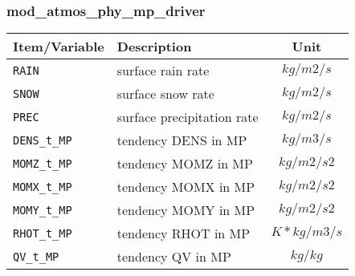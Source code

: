 \subsubsection{mod\_atmos\_phy\_mp\_driver}
 \begin{tabularx}{150mm}{|l|X|c|} \hline
 \rowcolor[gray]{0.9} Item/Variable & Description  & Unit \\ \hline
  \verb|RAIN| & surface rain rate & $kg/m2/s$ \\\hline
  \verb|SNOW| & surface snow rate & $kg/m2/s$ \\\hline
  \verb|PREC| & surface precipitation rate & $kg/m2/s$ \\\hline
  \verb|DENS_t_MP| & tendency DENS in MP & $kg/m3/s$ \\\hline
  \verb|MOMZ_t_MP| & tendency MOMZ in MP & $kg/m2/s2$ \\\hline
  \verb|MOMX_t_MP| & tendency MOMX in MP & $kg/m2/s2$ \\\hline
  \verb|MOMY_t_MP| & tendency MOMY in MP & $kg/m2/s2$ \\\hline
  \verb|RHOT_t_MP| & tendency RHOT in MP & $K*kg/m3/s$ \\\hline
  \verb|QV_t_MP|   & tendency QV in MP   & $kg/kg$     \\\hline
 \end{tabularx}

